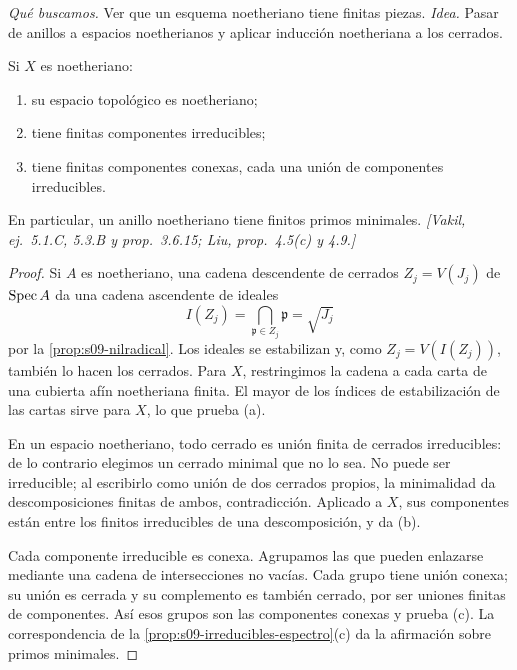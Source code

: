 \emph{Qué buscamos.} Ver que un esquema noetheriano tiene finitas piezas. \emph{Idea.} Pasar de anillos a espacios noetherianos y aplicar inducción noetheriana a los cerrados.

\begin{prop}
\label{prop:s09-finitud-noetherianos}
Si $X$ es noetheriano:
\begin{enumerate}[label=(\alph*)]
\item su espacio topológico es noetheriano;
\item tiene finitas componentes irreducibles;
\item tiene finitas componentes conexas, cada una unión de componentes irreducibles.
\end{enumerate}
En particular, un anillo noetheriano tiene finitos primos minimales. \emph{[Vakil, ej.~5.1.C, 5.3.B y prop.~3.6.15; Liu, prop.~4.5(c) y 4.9.]}
\end{prop}
\begin{proof}
Si $A$ es noetheriano, una cadena descendente de cerrados $Z_j=V(J_j)$ de $\operatorname{Spec} A$ da una cadena ascendente de ideales
\[
I(Z_j)=\bigcap_{\mathfrak p\in Z_j}\mathfrak p=\sqrt{J_j}
\]
por la \cref{prop:s09-nilradical}. Los ideales se estabilizan y, como $Z_j=V(I(Z_j))$, también lo hacen los cerrados. Para $X$, restringimos la cadena a cada carta de una cubierta afín noetheriana finita. El mayor de los índices de estabilización de las cartas sirve para $X$, lo que prueba (a).

En un espacio noetheriano, todo cerrado es unión finita de cerrados irreducibles: de lo contrario elegimos un cerrado minimal que no lo sea. No puede ser irreducible; al escribirlo como unión de dos cerrados propios, la minimalidad da descomposiciones finitas de ambos, contradicción. Aplicado a $X$, sus componentes están entre los finitos irreducibles de una descomposición, y da (b).

Cada componente irreducible es conexa. Agrupamos las que pueden enlazarse mediante una cadena de intersecciones no vacías. Cada grupo tiene unión conexa; su unión es cerrada y su complemento es también cerrado, por ser uniones finitas de componentes. Así esos grupos son las componentes conexas y prueba (c). La correspondencia de la \cref{prop:s09-irreducibles-espectro}(c) da la afirmación sobre primos minimales.
\end{proof}

